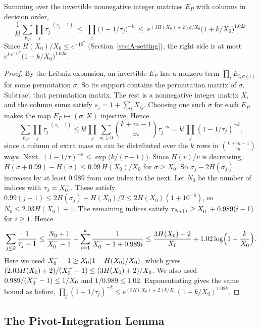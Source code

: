 \begin{lemma}\label{lem:pattern}\label{lem:patternsum}
Summing over the invertible nonnegative integer matrices $E_P$ with columns in decision order,
\[
  \frac1{k!}\sum_{E_P}\prod_j\tau_j^{-(s_j-1)}\ \le\ \prod_j\bigl(1-1/\tau_j\bigr)^{-k}
  \ \le\ e^{(3H(X_0)+2)k/X_0}\bigl(1+k/X_0\bigr)^{1.02k}.
\]
Since $H(X_0)/X_0\le e^{-10^{7}}$ (Section~\ref{sec:A-setting}), the right side is at most
$e^{k\,e^{-10^{6}}}\bigl(1+k/X_0\bigr)^{1.02k}$.
\end{lemma}

\begin{proof}
By the Leibniz expansion, an invertible $E_P$ has a nonzero term $\prod_iE_{i,\sigma(i)}$ for some permutation $\sigma$.
So its support contains the permutation matrix of $\sigma$. Subtract that permutation matrix. The rest is a nonnegative
integer matrix $X$, and the column sums satisfy $s_j=1+\sum_iX_{ij}$. Choosing one such $\sigma$ for each $E_P$ makes the
map $E_P\mapsto(\sigma,X)$ injective. Hence
\[
  \sum_{E_P}\prod_j\tau_j^{-(s_j-1)}\le k!\prod_j\sum_{m\ge0}\binom{k+m-1}{m}\tau_j^{-m}=k!\prod_j(1-1/\tau_j)^{-k},
\]
since a column of extra mass $m$ can be distributed over the $k$ rows in $\binom{k+m-1}{m}$ ways. Next,
$(1-1/\tau)^{-k}\le\exp\bigl(k/(\tau-1)\bigr)$. Since $H(v)/v$ is decreasing, $H(\sigma+0.99)-H(\sigma)\le0.99\,H(X_0)/X_0$ for
$\sigma\ge X_0$. So $\sigma_j-2H(\sigma_j)$ increases by at least $0.989$ from one index to the next. Let $N_0$ be the
number of indices with $\tau_j=X_0^{-}$. These satisfy $0.99(j-1)\le2H(\sigma_j)-H(X_0)/2\le2H(X_0)(1+10^{-8})$, so
$N_0\le2.03H(X_0)+1$. The remaining indices satisfy $\tau_{N_0+i}\ge X_0^{-}+0.989(i-1)$ for $i\ge1$. Hence
\[
  \sum_{j\le k}\frac1{\tau_j-1}\le\frac{N_0+1}{X_0^{-}-1}+\sum_{i=1}^{k}\frac1{X_0^{-}-1+0.989i}
  \le\frac{3H(X_0)+2}{X_0}+1.02\log\Bigl(1+\frac{k}{X_0}\Bigr).
\]
Here we used $X_0^{-}-1\ge X_0(1-H(X_0)/X_0)$, which gives $(2.03H(X_0)+2)/(X_0^{-}-1)\le(3H(X_0)+2)/X_0$. We also used
$0.989/(X_0^{-}-1)\le1/X_0$ and $1/0.989\le1.02$. Exponentiating gives the same bound as before,
$\prod_j(1-1/\tau_j)^{-k}\le e^{(3H(X_0)+2)k/X_0}(1+k/X_0)^{1.02k}$.
\end{proof}

\subsection{The Pivot-Integration Lemma}\label{sec:A-pil}

